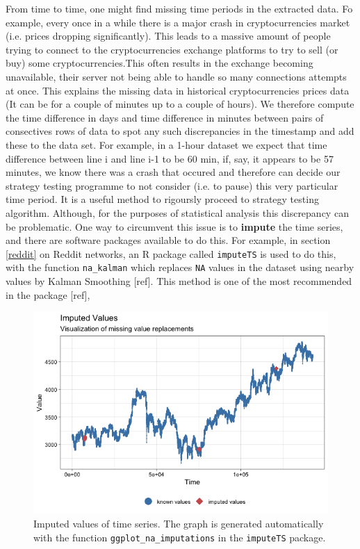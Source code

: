 \documentclass[twoside]{report}
\newcommand{\code}{\texttt}
\begin{document}
\begin{spacing}{1}
From time to time, one might find missing time periods in the extracted data. Fo example, every once in a while there is a major crash in cryptocurrencies market (i.e. prices dropping significantly). This leads to a massive amount of people trying to connect to the cryptocurrencies exchange platforms to try to sell (or buy) some cryptocurrencies.This often results in the exchange becoming unavailable, their server not being able to handle so many connections attempts at once. This explains the missing data in historical cryptocurrencies prices data (It can be for a couple of minutes up to a couple of hours). We therefore compute the time difference in days and time difference in minutes between pairs of consectives rows of data to spot any such discrepancies in the timestamp and add these to the data set. For example, in a 1-hour dataset we expect that time difference between line i and line i-1 to be 60 min, if, say, it appears to be 57 minutes, we know there was a crash that occured and therefore can decide our strategy testing programme to not consider (i.e. to pause) this very particular time period. It is a useful method to rigoursly proceed to strategy testing algorithm. 
Although, for the purposes of statistical analysis this discrepancy can be problematic. One way to circumvent this issue is to \textbf{impute} the time series, and there are software packages available to do this. For example, in section \ref{reddit} on Reddit networks, an R package called \code{imputeTS} is used to do this, with the function \code{na\_kalman} which replaces \code{NA} values in the dataset using nearby values by Kalman Smoothing [ref]. This method is one of the most recommended in the package [ref],

\begin{figure}[H]
    \centering
    \includegraphics[width=\linewidth]{Reddit_Analysis/Price_Data_Extraction/Data/Binance_OHLC/imputed_gg_1m.png}
    \caption{Imputed values of time series. The graph is generated automatically with the function \code{ggplot\_na\_imputations} in the \code{imputeTS} package.}
    \label{fig:imputations}
\end{figure}



\end{spacing}
\end{document}
